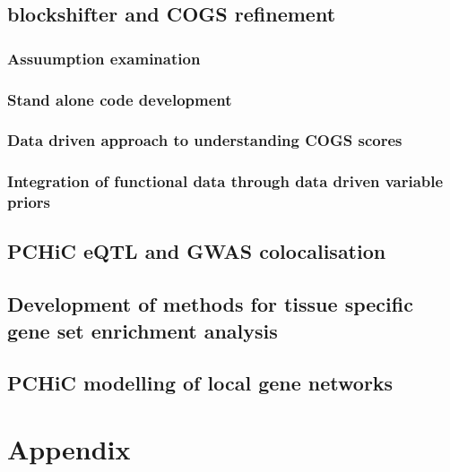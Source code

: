 \documentclass[a4paper,11pt]{book}
\begin{document}
\section{blockshifter and COGS refinement}
\subsection{Assuumption examination}
\subsection{Stand alone code development}
\subsection{Data driven approach to understanding COGS scores}
\subsection{Integration of functional data through data driven variable priors}
\section{PCHiC eQTL and GWAS colocalisation}
\section{Development of methods for tissue specific gene set enrichment analysis}
\section{PCHiC modelling of local gene networks} 
\chapter{Appendix}

	
	\begin{landscape}
	 	
	\end{landscape}



\end{document}
